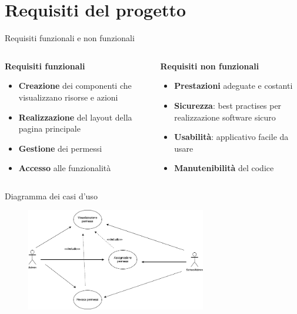 \documentclass[aspectratio=169]{beamer}
\begin{document}
\section{Requisiti del progetto}
\begin{frame}{Requisiti funzionali e non funzionali}
	\begin{columns}[T] %
		\begin{column}{0.5\textwidth}
			\textbf{Requisiti funzionali}
			\begin{itemize}
				\item \textbf{Creazione} dei componenti che visualizzano risorse e azioni
				\item \textbf{Realizzazione} del layout della pagina principale
				\item \textbf{Gestione} dei permessi
				\item \textbf{Accesso} alle funzionalità
			\end{itemize}
		\end{column}
		\begin{column}{0.5\textwidth}
			\textbf{Requisiti non funzionali}
			\begin{itemize}
				\item \textbf{Prestazioni} adeguate e costanti
				\item \textbf{Sicurezza}: best practises per realizzazione software sicuro
				\item \textbf{Usabilità}: applicativo facile da usare
				\item \textbf{Manutenibilità} del codice
			\end{itemize}
		\end{column}
	\end{columns}
\end{frame}

\begin{frame}[fragile]{Diagramma dei casi d'uso}
	\begin{figure}[H]
		\centering
		\includegraphics[width=0.7\textwidth]{../images/diagramma-casi-uso-attori.png}
	\end{figure}
\end{frame}
\end{document}
